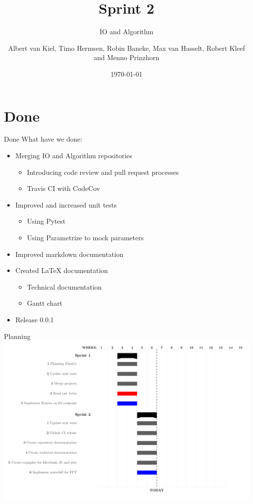 \documentclass{beamer}
\title{Sprint 2}
\subtitle{IO and Algorithm}
\author{Albert van Kiel, Timo Hermsen, Robin Baneke, Max van Hasselt, Robert Kleef and Menno Prinzhorn}
\date{\today}
\begin{document}
    
    \begin{frame}
        \titlepage
    \end{frame}
    
    \section{Done}

    \begin{frame}{Done}
        What have we done:
        \begin{itemize}
            \item Merging IO and Algorithm repositories
            \begin{itemize}
                \item Introducing code review and pull request processes
                \item Travis CI with CodeCov
            \end{itemize}
            \item Improved and increased unit tests
            \begin{itemize}
                \item Using Pytest
                \item Using Parametrize to mock parameters
            \end{itemize}
            \item Improved markdown documentation
            \item Created LaTeX documentation
            \begin{itemize}
                \item Technical documentation
                \item Gantt chart
            \end{itemize}
            \item Release 0.0.1
        \end{itemize}
    \end{frame}

    \begin{frame}{Planning}
        \includegraphics[scale=0.25]{planning}
    \end{frame}
    
\end{document}
